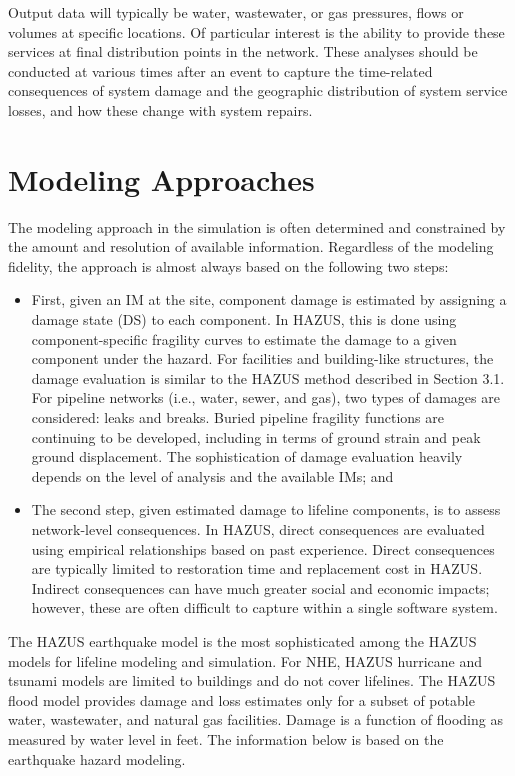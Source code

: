 Output data will typically be water, wastewater, or gas pressures, flows or volumes at specific locations. Of particular interest is the ability to provide these services at final distribution points in the network. These analyses should be conducted at various times after an event to capture the time-related consequences of system damage and the geographic distribution of system service losses, and how these change with system repairs.

\section{Modeling Approaches}
\label{sec:perf_pipeline_methods}

The modeling approach in the simulation is often determined and constrained by the amount and resolution of available information. Regardless of the modeling fidelity, the approach is almost always based on the following two steps: 

\begin{itemize}
    \item First, given an IM at the site, component damage is estimated by assigning a damage state (DS) to each component. In HAZUS, this is done using component-specific fragility curves to estimate the damage to a given component under the hazard. For facilities and building-like structures, the damage evaluation is similar to the HAZUS method described in Section 3.1. For pipeline networks (i.e., water, sewer, and gas), two types of damages are considered: leaks and breaks. Buried pipeline fragility functions are continuing to be developed, including in terms of ground strain and peak ground displacement. The sophistication of damage evaluation heavily depends on the level of analysis and the available IMs; and
        \vspace{2mm}
    \item The second step, given estimated damage to lifeline components, is to assess network-level consequences. In HAZUS, direct consequences are evaluated using empirical relationships based on past experience. Direct consequences are typically limited to restoration time and replacement cost in HAZUS. Indirect consequences can have much greater social and economic impacts; however, these are often difficult to capture within a single software system.
\end{itemize}

The HAZUS earthquake model is the most sophisticated among the HAZUS models for lifeline modeling and simulation. For NHE, HAZUS hurricane and tsunami models are limited to buildings and do not cover lifelines. The HAZUS flood model provides damage and loss estimates only for a subset of potable water, wastewater, and natural gas facilities. Damage is a function of flooding as measured by water level in feet. The information below is based on the earthquake hazard modeling.

